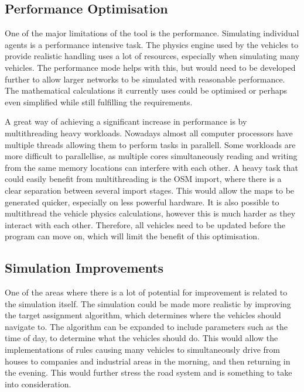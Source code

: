     \subsection{Performance Optimisation}
        One of the major limitations of the tool is the performance. Simulating individual agents is a performance intensive task. The physics engine used by the vehicles to provide realistic handling uses a lot of resources, especially when simulating many vehicles. The performance mode helps with this, but would need to be developed further to allow larger networks to be simulated with reasonable performance. The mathematical calculations it currently uses could be optimised or perhaps even simplified while still fulfilling the requirements.

        A great way of achieving a significant increase in performance is by multithreading heavy workloads. Nowadays almost all computer processors have multiple threads allowing them to perform tasks in parallell. Some workloads are more difficult to parallellise, as multiple cores simultaneously reading and writing from the same memory locations can interfere with each other. A heavy task that could easily benefit from multithreading is the OSM import, where there is a clear separation between several import stages. This would allow the maps to be generated quicker, especially on less powerful hardware. It is also possible to multithread the vehicle physics calculations, however this is much harder as they interact with each other. Therefore, all vehicles need to be updated before the program can move on, which will limit the benefit of this optimisation.


    \subsection{Simulation Improvements}
        One of the areas where there is a lot of potential for improvement is related to the simulation itself. The simulation could be made more realistic by improving the target assignment algorithm, which determines where the vehicles should navigate to. The algorithm can be expanded to include parameters such as the time of day, to determine what the vehicles should do. This would allow the implementations of rules causing many vehicles to simultaneously drive from houses to companies and industrial areas in the morning, and then returning in the evening. This would further stress the road system and is something to take into consideration.
        
